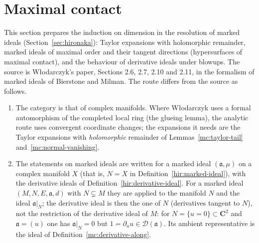 \section{Maximal contact}
\label{sec:maximal-contact}

This section prepares the induction on dimension in the resolution of marked ideals
(Section~\ref{sec:hironaka}): Taylor expansions with holomorphic remainder, marked ideals of
maximal order and their tangent directions (hypersurfaces of maximal contact), and the behaviour of
derivative ideals under blowups. The source is Włodarczyk's paper, Sections 2.6, 2.7, 2.10 and 2.11,
in the formalism of marked ideals of Bierstone and Milman. The route differs from the source as follows.
\begin{enumerate}
\item The category is that of complex manifolds. Where Włodarczyk uses a formal automorphism of the
completed local ring (the glueing lemma), the analytic route uses convergent coordinate changes;
the expansions it needs are the Taylor expansions with \emph{holomorphic} remainder of
Lemmas~\ref{mc:taylor-tail} and~\ref{mc:normal-vanishing}.
\item The statements on marked ideals are written for a marked ideal \((\mathfrak a,\mu)\) on a complex
manifold \(X\) (that is, \(N=X\) in Definition~\ref{hir:marked-ideal}), with the derivative ideals of
Definition~\ref{hir:derivative-ideal}. For a marked ideal \((M,N,E,\mathfrak a,d)\) with \(N\subsetneq M\) they
are applied to the manifold \(N\) and the ideal \(\mathfrak a|_N\); the derivative ideal is then the one of
\(N\) (derivatives tangent to \(N\)), not the restriction of the derivative ideal of \(M\): for
\(N=\{u=0\}\subset\mathbf C^2\) and \(\mathfrak a=(u)\) one has \(\mathfrak a|_N=0\) but \(1=\partial_uu\in\mathcal D(\mathfrak a)\).
Its ambient representative is the ideal of Definition~\ref{mc:derivative-along}.
\end{enumerate}

